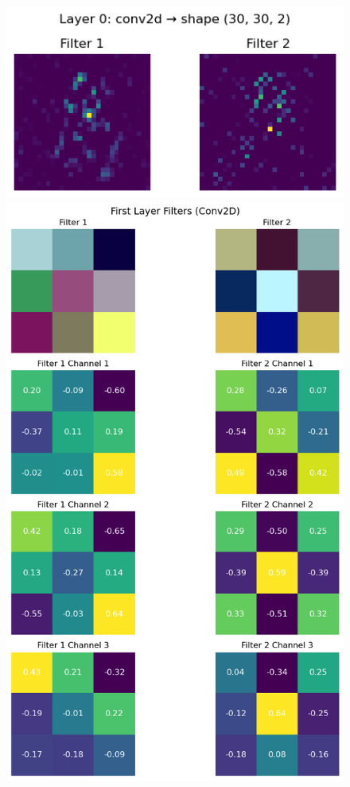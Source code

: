 \begin{figure}[H]
\begin{minipage}[t]{0.55\textwidth}
            \includegraphics[width=0.8\linewidth]{Plots/Appendix_B/imageNet_image_after_filter.png}
            \centering{}
        \end{minipage}
        \hfill
        \begin{minipage}[t]{0.35\textwidth}
            \includegraphics[width=\linewidth]{Plots/Appendix_B/Kernels_minimal_model.png}

\end{minipage}
\end{figure}
